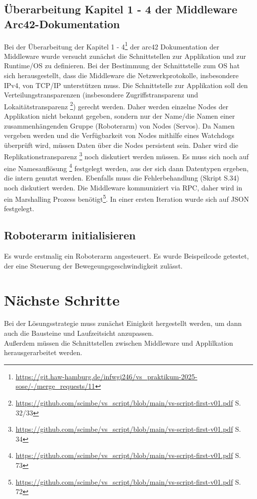 \documentclass{article}
\begin{document}
\subsection{Überarbeitung Kapitel 1 - 4 der Middleware Arc42-Dokumentation} 
Bei der Überarbeitung der Kapitel 1 - 4\footnote{\url{https://git.haw-hamburg.de/infwgi246/vs_praktikum-2025-sose/-/merge_requests/11}} der arc42 Dokumentation der Middleware wurde versucht zunächst die Schnittstellen zur Applikation und zur Runtime/OS zu definieren. 
Bei der Bestimmung der Schnittstelle zum OS hat sich herausgestellt, dass die Middleware die Netzwerkprotokolle, insbesondere IPv4, von TCP/IP unterstützen muss. 
Die Schnittstelle zur Applikation soll den Verteilungstransparenzen (insbesondere Zugriffstransparenz und Lokaitätstransparenz \footnote{\url{https://github.com/scimbe/vs_script/blob/main/vs-script-first-v01.pdf} S. 32/33 }) gerecht werden. 
Daher werden einzelne Nodes der Applikation nicht bekannt gegeben, sondern nur der Name/die Namen einer zusammenhängenden Gruppe (Roboterarm) von Nodes (Servos). 
Da Namen vergeben werden und die Verfügbarkeit von Nodes mithilfe eines Watchdogs überprüft wird, müssen Daten über die Nodes persistent sein. 
Daher wird die Replikationstransparenz \footnote{\url{https://github.com/scimbe/vs_script/blob/main/vs-script-first-v01.pdf} S. 34 } noch diskutiert werden müssen. Es muss sich noch auf eine Namesauflösung \footnote{\url{https://github.com/scimbe/vs_script/blob/main/vs-script-first-v01.pdf} S. 73 } festgelegt werden, 
aus der sich dann Datentypen ergeben, die intern genutzt werden. Ebenfalls muss die Fehlerbehandlung (Skript S.34) noch diskutiert werden. Die Middleware kommuniziert via RPC, 
daher wird in ein Marshalling Prozess benötigt\footnote{\url{https://github.com/scimbe/vs_script/blob/main/vs-script-first-v01.pdf} S. 72 }. In einer ersten Iteration wurde sich auf JSON festgelegt. 

\subsection{Roboterarm initialisieren}

Es wurde erstmalig ein Roboterarm angesteuert. Es wurde Beispeilcode getestet, der eine Steuerung der Bewegeungsgeschwindigkeit zulässt.

\section{Nächste Schritte}

Bei der Lösungsstrategie muss zunächst Einigkeit hergestellt werden, um dann auch die Bausteine und Laufzeitsicht anzupassen. \\
Außerdem müssen die Schnittstellen zwischen Middleware und Applilkation herausgerarbeitet werden. 
\end{document}
